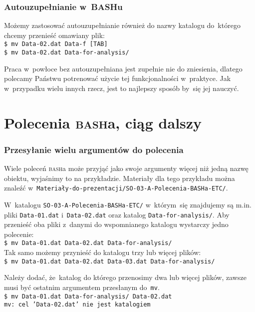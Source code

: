 \documentclass[10pt,t]{beamer}
\begin{document}
\begin{frame}
  \frametitle{Autouzupełnianie w~BASHu}


  Możemy zastosować autouzupełnianie również do nazwy katalogu do~którego
  chcemy przenieść omawiany plik: \\
  \texttt{\$ mv Data-02.dat Data-f [TAB]} \\
  \texttt{\$ mv Data-02.dat Data-for-analysis/}

  Praca w~powłoce bez autouzupełniana jest zupełnie nie do zniesienia,
  dlatego polecamy Państwu potrenować użycie tej funkcjonalności w~praktyce.
  Jak w~przypadku wielu innych rzecz, jest to najlepszy sposób by~się jej
  nauczyć.

\end{frame}










\section{Polecenia \textsc{bash}a, ciąg dalszy}


\begin{frame}
  \frametitle{Przesyłanie wielu argumentów do polecenia}


  Wiele poleceń \textsc{bash}a może przyjąć jako swoje argumenty więcej
  niż jedną nazwę obiektu, wyjaśnimy to na przykładzie. Materiały
  dla tego przykładu można znaleźć
  w~\texttt{Materiały-do-prezentacji/SO-03-A-Polecenia-BASHa-ETC/}.

  W~katalogu \texttt{SO-03-A-Polecenia-BASHa-ETC/} w~którym~się znajdujemy
  są m.in. pliki \texttt{Data-01.dat} i~\texttt{Data-02.dat} oraz katalog
  \texttt{Data-for-analysis/}. Aby przenieść oba pliki z~danymi do
  wspomnianego katalogu wystarczy jedno polecenie: \\
  \texttt{\$ mv Data-01.dat Data-02.dat Data-for-analysis/} \\
  Tak samo możemy przynieść do katalogu trzy lub więcej plików: \\
  \texttt{\$ mv Data-01.dat Data-02.dat Data-03.dat Data-for-analysis/}

  Należy dodać, że~katalog do którego przenosimy dwa lub więcej plików,
  \alert{zawsze} musi być ostatnim argumentem przesłanym do~\texttt{mv}. \\
  \texttt{\$ mv Data-01.dat Data-for-analysis/ Data-02.dat} \\
  \texttt{mv: cel 'Data-02.dat' nie jest katalogiem}

\end{frame}
\end{document}
